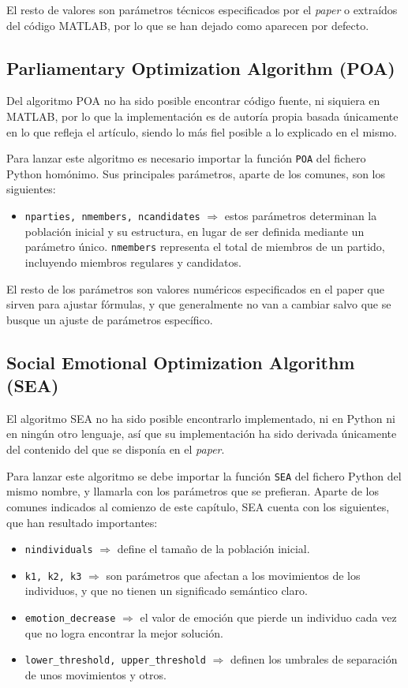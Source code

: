 El resto de valores son parámetros técnicos especificados por el \textit{paper} o extraídos del código MATLAB, por lo que se han dejado como aparecen por defecto.

\subsection{Parliamentary Optimization Algorithm (POA)}

Del algoritmo POA no ha sido posible encontrar código fuente, ni siquiera en MATLAB, por lo que la implementación es de autoría propia basada únicamente en lo que refleja el artículo, siendo lo más fiel posible a lo explicado en el mismo.

Para lanzar este algoritmo es necesario importar la función \texttt{POA} del fichero Python homónimo. Sus principales parámetros, aparte de los comunes, son los siguientes:

\begin{itemize}
	\item \texttt{nparties, nmembers, ncandidates} $\Rightarrow$ estos parámetros determinan la población inicial y su estructura, en lugar de ser definida mediante un parámetro único. \texttt{nmembers} representa el total de miembros de un partido, incluyendo miembros regulares y candidatos.
\end{itemize}

El resto de los parámetros son valores numéricos especificados en el paper que sirven para ajustar fórmulas, y que generalmente no van a cambiar salvo que se busque un ajuste de parámetros específico.

\subsection{Social Emotional Optimization Algorithm (SEA)}

El algoritmo SEA no ha sido posible encontrarlo implementado, ni en Python ni en ningún otro lenguaje, así que su implementación ha sido derivada únicamente del contenido del que se disponía en el \textit{paper}.

Para lanzar este algoritmo se debe importar la función \texttt{SEA} del fichero Python del mismo nombre, y llamarla con los parámetros que se prefieran. Aparte de los comunes indicados al comienzo de este capítulo, SEA cuenta con los siguientes, que han resultado importantes:

\begin{itemize}
	\item \texttt{nindividuals} $\Rightarrow$ define el tamaño de la población inicial.
	\item \texttt{k1, k2, k3} $\Rightarrow$ son parámetros que afectan a los movimientos de los individuos, y que no tienen un significado semántico claro.
	\item \texttt{emotion\_decrease} $\Rightarrow$ el valor de emoción que pierde un individuo cada vez que no logra encontrar la mejor solución.
	\item \texttt{lower\_threshold, upper\_threshold} $\Rightarrow$ definen los umbrales de separación de unos movimientos y otros.
\end{itemize}

